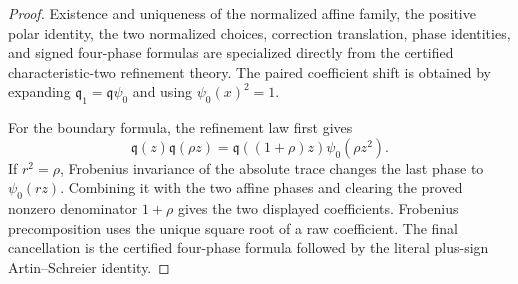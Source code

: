 \begin{proof}
Existence and uniqueness of the normalized affine family, the positive
polar identity, the two normalized choices, correction translation,
phase identities, and signed four-phase formulas are specialized
directly from the certified characteristic-two refinement theory.
The paired coefficient shift is obtained by expanding
$\mathfrak q_1=\mathfrak q\psi_0$ and using
$\psi_0(x)^2=1$.

For the boundary formula, the refinement law first gives
\[
 \mathfrak q(z)\mathfrak q(\rho z)
 =\mathfrak q((1+\rho)z)\psi_0(\rho z^2).
\]
If $r^2=\rho$, Frobenius invariance of the absolute trace changes the
last phase to $\psi_0(rz)$.  Combining it with the two affine phases
and clearing the proved nonzero denominator $1+\rho$ gives the two
displayed coefficients.  Frobenius precomposition uses the unique
square root of a raw coefficient.  The final cancellation is the
certified four-phase formula followed by the literal plus-sign
Artin--Schreier identity.
\end{proof}
